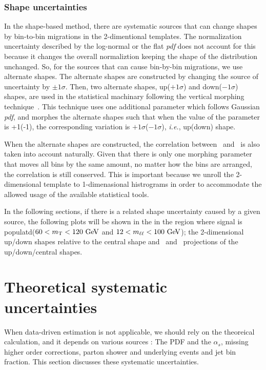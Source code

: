 \subsubsection{Shape uncertainties}

In the shape-based method, there are systematic sources that can change shapes 
by bin-to-bin migrations in the 2-dimentional templates. 
The normalization uncertainty described by the log-normal or the flat \textit{pdf}  
does not account for this because it changes the overall normaliztion 
keeping the shape of the distribution unchanged. So, for the sources that can cause 
bin-by-bin migrations, we use alternate shapes.  
The alternate shapes are constructed by changing the source of uncertainty 
by $\pm 1\sigma$. Then, two alternate shapes, up($+1\sigma$) and down($-1\sigma$) shapes,
are used in the statistical machinary following the vertical morphing 
technique~\cite{2011arXiv1103.0354C}. 
This technique uses one additional parameter which follows Gaussian \textit{pdf},
and morphes the alternate shapes such that when the value of the parameter 
is +1(-1), the corresponding variation is $+1\sigma$($-1\sigma$), 
\textit{i.e.}, up(down) shape. 

When the alternate shapes are constructed, 
the correlation between \mT\ and \mll\ is also taken into account naturally.  
Given that there is only one morphing parameter that moves all bins 
by the same amount,  
no matter how the bins are arranged, the correlation is still conserved.  
This is important because we unroll the 2-dimensional template to 1-dimenasional 
histrograms in order to accommodate the allowed usage of the available statistical tools. 

In the following sections, if there is a related shape uncertainty
caused by a given source, the following plots will be shown in the
in the region where signal is populatd($60<m_{\mathrm{T}}<120~\mathrm{Ge\kern -0.1em V}$ and $12<m_{\ell\ell}<100~\mathrm{Ge\kern -0.1em V}$); 
the 2-dimensional up/down shapes relative to the central shape 
and \mT\ and \mll\ projections of the up/down/central shapes. 

\section{Theoretical systematic uncertainties}

When data-driven estimation is not applicable, we should rely on the theoreical 
calculation, and it depends on various sources : The PDF and the $\alpha_s$,  
missing higher order corrections, parton shower and underlying events 
and jet bin fraction. 
This section discusses these systematic uncertainties. 

